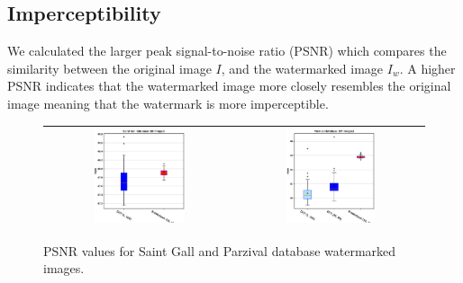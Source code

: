 \documentclass[runningheads]{llncs}
\begin{document}
\subsection{Imperceptibility}
We calculated the larger peak signal-to-noise ratio (PSNR) which compares the similarity between the original image $ I $, and the watermarked image $ I_w $. A higher PSNR indicates that the watermarked image more closely resembles the original image meaning that the watermark is more imperceptible.
\begin{figure}[H]
	\begin{center}
		\begin{tabular}{|c|c|}\hline
			\includegraphics[width=0.5\textwidth]{PSNR_saintgall.eps}
			&\includegraphics[width=0.5\textwidth]{PSNR_parzival.eps}\\\hline
		\end{tabular}
	\end{center}
	\caption{PSNR values for Saint Gall and Parzival database watermarked images.}
	\label{psnr}
\end{figure}
\end{document}
